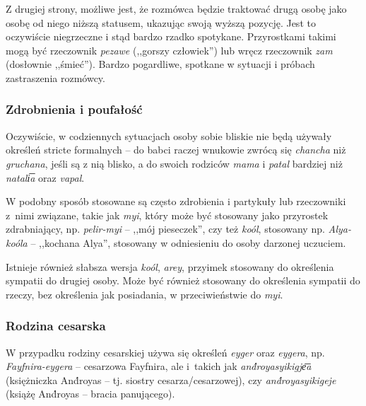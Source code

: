 \begin{spacing}{1.1}

\skipline

Z drugiej strony, możliwe jest, że rozmówca będzie traktować drugą osobę jako
osobę od niego niższą statusem, ukazując swoją wyższą pozycję. Jest to
oczywiście niegrzeczne i stąd bardzo rzadko spotykane. Przyrostkami takimi mogą
być rzeczownik \emph{pezawe} (,,gorszy człowiek'') lub wręcz rzeczownik
\emph{zam} (dosłownie ,,śmieć''). Bardzo pogardliwe, spotkane w sytuacji i
próbach zastraszenia rozmówcy.

\subsubsection{Zdrobnienia i poufałość}

Oczywiście, w codziennych sytuacjach osoby sobie bliskie nie będą używały
określeń stricte formalnych -- do babci raczej wnukowie zwrócą się
\emph{chancha} niż \emph{gruchana}, jeśli są z nią blisko, a do swoich rodziców
\emph{mama} i \emph{patal} bardziej niż \emph{natali͞a} oraz \emph{vapal}.

W podobny sposób stosowane są często zdrobienia i partykuły lub rzeczowniki
z~nimi związane, takie jak \emph{myi}, który może być stosowany jako przyrostek
zdrabniający, np. \emph{pelir-myi} -- ,,mój pieseczek'', czy też \emph{koól},
stosowany np. \emph{Alya-koóla} -- ,,kochana Alya'', stosowany w odniesieniu do
osoby darzonej uczuciem.

Istnieje również słabsza wersja \emph{koól}, \emph{arey}, przyimek stosowany do
określenia sympatii do drugiej osoby. Może być również stosowany do określenia
sympatii do rzeczy, bez określenia jak posiadania, w przeciwieństwie do
\emph{myi}.

\subsubsection{Rodzina cesarska}

W przypadku rodziny cesarskiej używa się określeń \emph{eyger} oraz
\emph{eygera}, np. \emph{Fayfnira-eygera} -- cesarzowa Fayfnira, ale i~takich
jak \emph{and́royasyikigje͞a} (księżniczka And́royas -- tj. siostry
cesarza/cesarzowej), czy \emph{and́royasyikigeje} (książę And́royas -- bracia
panującego).


\end{spacing}
